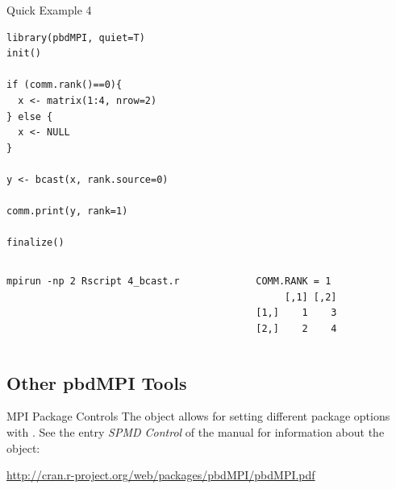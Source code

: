 \begin{frame}
  \begin{exampleblock}{Quick Example 4}
\begin{lstlisting}[title=Broadcast: 4\_bcast.r]
library(pbdMPI, quiet=T)
init()

if (comm.rank()==0){
  x <- matrix(1:4, nrow=2)
} else {
  x <- NULL
}

y <- bcast(x, rank.source=0)

comm.print(y, rank=1)

finalize()
\end{lstlisting}
  \begin{columns}[t,onlytextwidth]
    \begin{column}{0.58\textwidth}
\begin{lstlisting}[backgroundcolor=\color{white},keywordstyle=\color{black},title=Execute this script via:]
mpirun -np 2 Rscript 4_bcast.r
\end{lstlisting}
\end{column}
    \hfill
    \begin{column}{0.4\textwidth}
\begin{lstlisting}[title=Sample Output:]
COMM.RANK = 1
     [,1] [,2]
[1,]    1    3
[2,]    2    4
\end{lstlisting}
    \end{column}
​  \end{columns}
  \end{exampleblock}
\end{frame}







\subsection{Other pbdMPI Tools}


\begin{frame}
  \begin{block}{MPI Package Controls}
The  object allows for setting different package options with .  See the entry \emph{SPMD Control} of the  manual for information about the  object:
\begin{center}
{ \small
\url{http://cran.r-project.org/web/packages/pbdMPI/pbdMPI.pdf}
}
\end{center}
  \end{block}
\end{frame}

